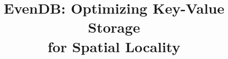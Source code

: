 \documentclass[sigplan,10pt]{acmart}
\date{}
\newcommand{\sys}{EvenDB}
\providecommand{\DIFaddbegin}{} %
\providecommand{\DIFaddend}{} %
\providecommand{\DIFdelbegin}{} %
\begin{document}
\title[\sys: Key-Value Storage for Spatial Locality]{\sys: Optimizing Key-Value Storage\\ for Spatial Locality} 
\DIFaddbegin \author{}
\DIFaddend 

\DIFdelbegin %







\end{document}
